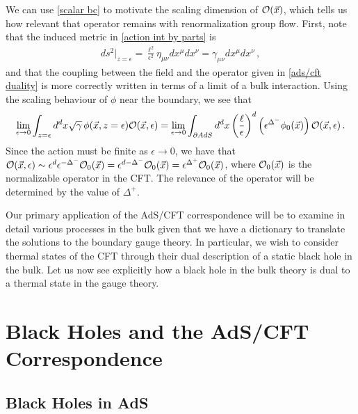 \documentclass[../PhD.tex]{subfiles}
\begin{document}
We can use \eqref{scalar bc} to motivate the scaling dimension of $\mathcal O (\vec x)$, which tells us how relevant that operator remains with renormalization group flow. First, note that the induced metric in \eqref{action int by parts} is
\begin{align}
ds^2 \Big|_{z=\epsilon} = \frac{\ell^2}{\epsilon^2} \eta_{\mu \nu} dx^\mu dx^\nu = \gamma_{\mu \nu} dx^\mu dx^\nu \, ,
\end{align}
and that the coupling between the field and the operator given in \eqref{ads/cft duality} is more correctly written in terms of a limit of a bulk interaction. Using the scaling behaviour of $\phi$ near the boundary, we see that
\begin{align}
\lim_{\epsilon \to 0} \int_{z=\epsilon} d^{d}x \sqrt{\gamma} \, \phi(\vec x, z = \epsilon) \mathcal O(\vec x, \epsilon) = \lim_{\epsilon \to 0} \int_{\partial AdS} d^d x \left(\frac{\ell}{\epsilon}\right)^d \left( \epsilon^{\Delta^-} \phi_0 (\vec x) \right) \mathcal O (\vec x, \epsilon) \, .
\end{align}
Since the action must be finite as $\epsilon \to 0$, we have that $ \mathcal O(\vec x, \epsilon) \sim \epsilon^{d} \epsilon^{-\Delta^-} \mathcal O_0 (\vec x) = \epsilon^{d - \Delta^-} \mathcal O_0 (\vec x) = \epsilon^{\Delta^+} \mathcal O_0 (\vec x)$, where $\mathcal O_0(\vec x)$ is the normalizable operator in the CFT. The relevance of the operator will be determined by the value of $\Delta^+$.

Our primary application of the AdS/CFT correspondence will be to examine in detail various processes in the bulk given that we have a dictionary to translate the solutions to the boundary gauge theory. In particular, we wish to consider thermal states of the CFT through their dual description of a static black hole in the bulk. Let us now see explicitly how a black hole in the bulk theory is dual to a thermal state in the gauge theory.


\section{Black Holes and the AdS/CFT Correspondence}
\label{sec: bh in ads}


\subsection{Black Holes in AdS}
\label{sub: bh in ads}
\end{document}

